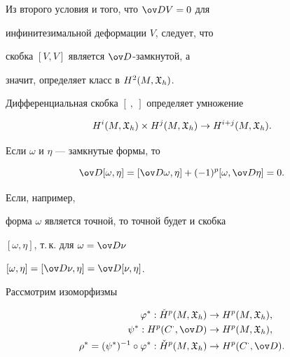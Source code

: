 Из второго условия и того, что $\ov D V=0$ для


инфинитезимальной деформации $V$, следует, что


скобка $ [V, V]$ является $\ov D$-замкнутой, а


значит, определяет класс в $H^2 (M, {\frak X}_h)$.





\begin{assrt}


Дифференциальная скобка $[\ , \ ]$ определяет умножение


$$


H^i ({M}, {\frak X}_h) \times H^j ({M}, {\frak X}_h)


\to H^{i+j} ({M}, {\frak X}_h).


$$


\end{assrt}





\begin{pf}


Если $\omega$ и $\eta$ --- замкнутые формы, то


$$


\ov D [\omega, \eta]=[\ov D \omega, \eta]


+ (-1)^p [\omega, \ov D \eta]=0.


$$


Если, например,


форма $\omega $ является точной, то точной будет и скобка


$[\omega, \eta] $, т.\,к. для $\omega=\ov D \nu$\;


$[\omega, \eta]=[\ov D \nu, \eta]=\ov D [\nu,


\eta]$.


\end{pf}





Рассмотрим изоморфизмы


\begin{align*}


\varphi^{\ast} : \Check H^{p} (M, {\frak


X}_h) &\to H^{p} (M, {\frak X}_h),\\


\psi^{\ast} : H^{p} (C^{\cdot}, \ov D) &\to


H^{p} (M, {\frak X}_h),\\


\rho^{\ast} =


(\psi^{\ast})^{-1} \circ \varphi^{\ast} : \Check H^{p}


 (M, {\frak X}_h) &\to H^{p} (C^{\cdot}, \ov D).


\end{align*}





